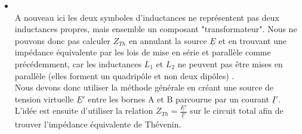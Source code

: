 {\begin{itemize}
$$\underline{V}_{L_1}=j\omega L_1\underline{I}-j\omega M\underline{I}$$
$$\underline{V}_{L_2}=j\omega L_2\underline{I}-j\omega M\underline{I}$$
On a donc:
$$\underline{E}=(R_{1}+j\omega L_{1}-j\omega M+j\omega L_{2}-j\omega M+\frac{1}{j\omega C})\underline{I}$$
$$\Leftrightarrow \underline{I}=\frac{\underline{E}}{R_{1}+j\omega L_{1}-2j\omega M+j\omega L_{2}+\frac{1}{j\omega C}}$$
La tension équivalente de Thévenin $\underline{V}_{Th}$ étant celle de la mise en série de $L_2$ et $C$ ($\underline{V}_{R_2}=0$), on a:
$$\underline{V}_{Th}=\underline{V}_{L_2}+\underline{V}_{C}=(j\omega L_{2}-j\omega M+\frac{1}{j\omega C})\underline{I}=\frac{j\omega (L_{2}-M)+\frac{1}{j\omega C}}{R_{1}+j\omega (L_{1}+L_{2}-2M)+\frac{1}{j\omega C}}\underline{E}$$
En remplacant par les données de l'énoncé:
$$\underline{V}_{Th}=10\frac{-4j}{2-2j}=14,14e^{-j45^{o}}$$
$$v_{Th}(t)=14,14cos(\omega t-45^{o}) [V]$$

\item {}\\
A nouveau ici les deux symboles d'inductances ne représentent pas deux inductances propres, mais ensemble un composant "transformateur". Nous ne pouvons donc pas calculer $Z_{Th}$ en annulant la source $\underline{E}$ et en trouvant une impédance équivalente par les lois de mise en série et parallèle comme précédemment, car les inductances $L_{1}$ et $L_{2}$ ne peuvent pas être mises en parallèle (elles forment un quadripôle et non deux dipôles) .\\

Nous devons donc utiliser la méthode générale en créant une source de tension virtuelle $\underline{E}'$ entre les bornes A et B parcourue par un courant $\underline{I}'$.\\

L'idée est ensuite d'utiliser la relation $Z_{Th}=\frac{\underline{E'}}{\underline{I'}}$ sur le circuit total afin de trouver l'impédance équivalente de Thévenin.\\


\end{itemize}}
